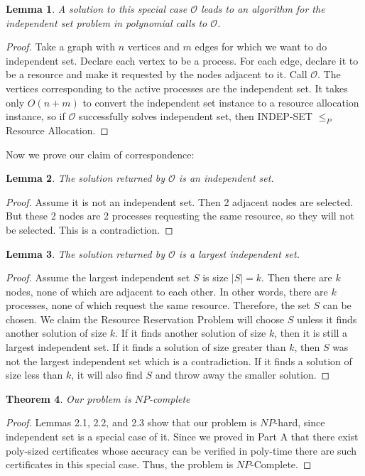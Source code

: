 \documentclass{article}
\newtheorem{theorem}{Theorem}[section]
\newtheorem{lemma}[theorem]{Lemma}
\begin{document}
\begin{lemma}
A solution to this special case $\mathcal{O}$ leads to an algorithm for the independent set problem in polynomial calls to $\mathcal{O}$. 
\end{lemma}
\begin{proof}
Take a graph with $n$ vertices and $m$ edges for which we want to do independent set.  Declare each vertex to be a process.  For each edge, declare it to be a resource and make it requested by the nodes adjacent to it. Call $\mathcal{O}$. The vertices corresponding to the active processes are the independent set. It takes only $O(n+m)$ to convert the independent set instance to a resource allocation instance, so if $\mathcal{O}$ successfully solves independent set, then INDEP-SET $\leq_P$ Resource Allocation.
\end{proof}

Now we prove our claim of correspondence:

\begin{lemma}
The solution returned by $\mathcal{O}$ is an independent set.
\end {lemma}
\begin {proof}
Assume it is not an independent set. Then 2 adjacent nodes are selected. But these 2 nodes are 2 processes requesting the same resource, so they will not be selected. This is a contradiction.
\end {proof}

\begin{lemma}
The solution returned by $\mathcal{O}$ is a largest independent set.
\end {lemma}
\begin {proof}
Assume the largest independent set $S$ is size $|S| = k$. Then there are $k$ nodes, none of which are adjacent to each other. In other words, there are $k$ processes, none of which request the same resource. Therefore, the set $S$ can be chosen. We claim the Resource Reservation Problem will choose $S$ unless it finds another solution of size $k$. If it finds another solution of size $k$, then it is still a largest independent set. If it finds a solution of size greater than $k$, then $S$ was not the largest independent set which is a contradiction. If it finds a solution of size less than $k$, it will also find $S$ and throw away the smaller solution.
\end {proof}

\begin{theorem}
Our problem is $NP$-complete
\end{theorem}
\begin{proof}
Lemmas 2.1, 2.2, and 2.3 show that our problem is $NP$-hard, since independent set is a special case of it. Since we proved in Part A that there exist poly-sized certificates whose accuracy can be verified in poly-time there are such certificates in this special case. Thus, the problem is $NP$-Complete. 
\end{proof}
\end{document}
